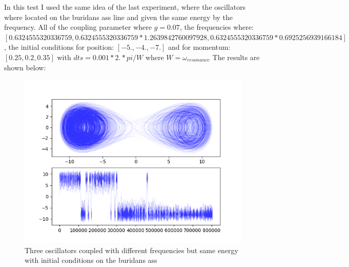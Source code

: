 \documentclass[idxtotoc,hyperref,openany]{labbook} %
\begin{document}
In this test I used the same idea of the last experiment, where the oscillators where located on the buridans ass line and given the same energy by the frequency. All of the coupling parameter where $g=0.07$, the frequencies where: $[0.6324555320336759,0.6324555320336759*1.2639842760097928,0.6324555320336759*0.6925256939166184]$, the initial conditions for position: $[-5.,-4.,-7.]$ and for momentum: $[0.25,0.2,0.35]$ with $dts=0.001*2. *pi/W$ where $W=\omega_{resonance}$
The results are shown below:
\begin{figure}[H] %
\begin{center}
\includegraphics[width=1\linewidth]{tres_osci_otro_intento.png}
\end{center}
\caption{Three oscillators coupled with different frequencies but same energy with initial conditions on the buridans ass}
\label{fig:three_osci_diff_freq_same_energy_pos}
\end{figure}
\end{document}
